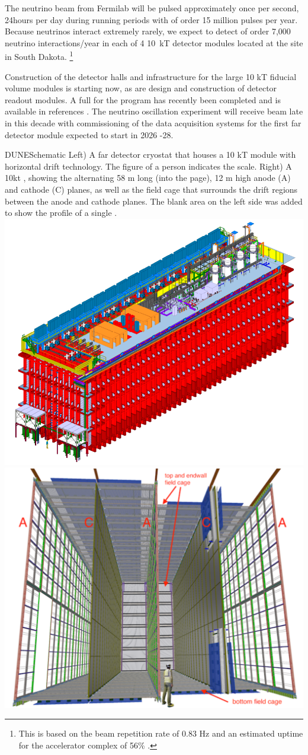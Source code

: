 \documentclass[../main-v1.tex]{subfiles}
\begin{document}
The neutrino beam from Fermilab will be pulsed approximately once per second, 24hours per day during running periods with of order 15 million pulses per year.  Because neutrinos interact  extremely rarely, we expect to detect of order 7,000 neutrino interactions/year in each of 4 10~kT detector modules located at the  site in South Dakota. \footnote{This is based on the beam repetition rate of 0.83 Hz and an estimated uptime for the accelerator complex of 56\% \cite{Abi:2020evt}.}






Construction of the detector halls and infrastructure for the large 10 kT fiducial volume  modules is starting now, as are design and construction of detector readout modules.  A full  for the program has recently been completed and is available in references \cite{DUNE:2020lwj, Abi:2020evt, Abi:2020oxb, Abi:2020loh}.
The   neutrino oscillation experiment will receive beam late in this decade with commissioning of the data acquisition systems for the first far detector module expected to start in 2026 -28.  


\begin{dunefigure}
{DUNESchematic} %
{Left) A far detector cryostat that houses a 10 kT  module with horizontal drift technology. The figure of a person indicates the scale.  Right) A 10kt    , showing the alternating 58 m long (into the page), 12 m high anode (A) and cathode (C) planes, as well as the field cage that surrounds the drift regions between the anode and cathode planes. The blank area on the left side was added to show the profile of a single .}
\includegraphics[height=0.35\textwidth]{graphics/IntroFigures/Fig_03a_cryostat-scale.png}
\includegraphics[height=0.35\textwidth]{graphics/IntroFigures/Fig_03b_DUNESchematic.pdf}
\end{dunefigure}
\end{document}
